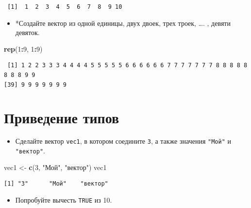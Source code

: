 \documentclass[
]{book}
\newenvironment{Shaded}{\begin{snugshade}}{\end{snugshade}}
\newcommand{\DecValTok}[1]{\textcolor[rgb]{0.00,0.00,0.81}{#1}}
\newcommand{\KeywordTok}[1]{\textcolor[rgb]{0.13,0.29,0.53}{\textbf{#1}}}
\newcommand{\NormalTok}[1]{#1}
\newcommand{\OperatorTok}[1]{\textcolor[rgb]{0.81,0.36,0.00}{\textbf{#1}}}
\newcommand{\StringTok}[1]{\textcolor[rgb]{0.31,0.60,0.02}{#1}}
\providecommand{\tightlist}{%
  \setlength{\itemsep}{0pt}\setlength{\parskip}{0pt}}
\begin{document}
\begin{verbatim}
 [1]  1  2  3  4  5  6  7  8  9 10
\end{verbatim}

\begin{itemize}
\tightlist
\item
  *Создайте вектор из одной единицы, двух двоек, трех троек, \ldots. , девяти девяток.
\end{itemize}

\begin{Shaded}
\begin{Highlighting}[]
\KeywordTok{rep}\NormalTok{(}\DecValTok{1}\OperatorTok{:}\DecValTok{9}\NormalTok{, }\DecValTok{1}\OperatorTok{:}\DecValTok{9}\NormalTok{)}
\end{Highlighting}
\end{Shaded}

\begin{verbatim}
 [1] 1 2 2 3 3 3 4 4 4 4 5 5 5 5 5 6 6 6 6 6 6 7 7 7 7 7 7 7 8 8 8 8 8 8 8 8 9 9
[39] 9 9 9 9 9 9 9
\end{verbatim}

\hypertarget{solution_coer}{%
\section{Приведение типов}\label{solution_coer}}

\begin{itemize}
\tightlist
\item
  Сделайте вектор \texttt{vec1}, в котором соедините \texttt{3}, а также значения \texttt{"Мой"} и \texttt{"вектор"}.
\end{itemize}

\begin{Shaded}
\begin{Highlighting}[]
\NormalTok{vec1 <-}\StringTok{ }\KeywordTok{c}\NormalTok{(}\DecValTok{3}\NormalTok{, }\StringTok{"Мой"}\NormalTok{, }\StringTok{"вектор"}\NormalTok{)}
\NormalTok{vec1}
\end{Highlighting}
\end{Shaded}

\begin{verbatim}
[1] "3"      "Мой"    "вектор"
\end{verbatim}

\begin{itemize}
\tightlist
\item
  Попробуйте вычесть \texttt{TRUE} из 10.
\end{itemize}
\end{document}
